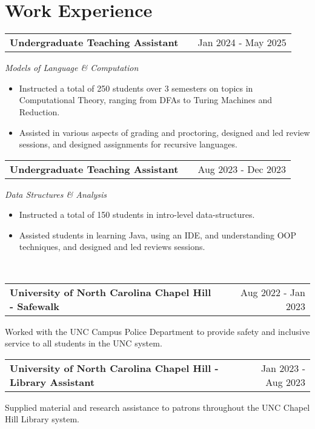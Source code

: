 \documentclass[a4paper,10pt]{article}
\makeatletter
\newenvironment{jobshort}[2]
    {
    \begin{tabularx}{\linewidth}{@{}l X r@{}}
    \textbf{#1} & \hfill &  #2 \\[3.75pt]
    \end{tabularx}
    }
    {
    }
\newenvironment{joblong}[3]
    {
    \begin{tabularx}{\linewidth}{@{}l X r@{}}
    \textbf{#1} & \hfill &  #2 \\[3.75pt]
    \end{tabularx}
    \begin{minipage}[t]{\linewidth}
    \textit{#3}
    
    \begin{itemize}[nosep,after=\strut, leftmargin=1em, itemsep=3pt,label=--]
    }
    {
    \end{itemize}
    \end{minipage}    
    }
\makeatother
\begin{document}
\section{Work Experience}

\begin{joblong}{Undergraduate Teaching Assistant}{Jan 2024 - May 2025}{Models of Language \& Computation}
    \item Instructed a total of 250 students over 3 semesters on topics in Computational Theory, ranging from DFAs to Turing Machines and Reduction.
 \item Assisted in various aspects of grading and proctoring, designed and led review sessions, and designed assignments for recursive languages.
\end{joblong}

\begin{joblong}{Undergraduate Teaching Assistant}{Aug 2023 - Dec 2023}{Data Structures \& Analysis}
\item Instructed a total of 150 students in intro-level data-structures. 
\item Assisted students in learning Java, using an IDE, and understanding OOP techniques, and designed and led reviews sessions.
\end{joblong}\\

\begin{jobshort}{University of North Carolina Chapel Hill - Safewalk}{Aug 2022 - Jan 2023}
Worked with the UNC Campus Police Department to provide safety and inclusive service to all students in the UNC system.
\end{jobshort}

\begin{jobshort}{University of North Carolina Chapel Hill - Library Assistant}{Jan 2023 - Aug 2023}
Supplied material and research assistance to patrons throughout the UNC Chapel Hill Library system.

\end{jobshort}




  






\vfill
{}
\end{document}
